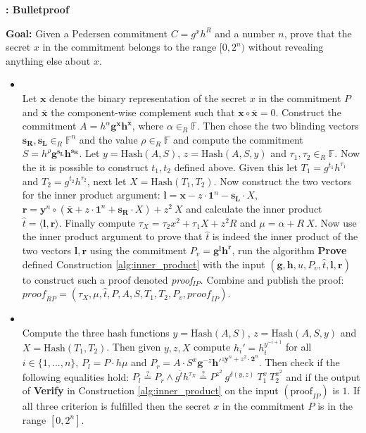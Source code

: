 \begin{algorithm}[]
\caption{\textbf{: Bulletproof}}
\textbf{Goal:}  Given a Pedersen commitment $C=g^x h^R$ and a number $n$, prove that the secret $x$ in the commitment belongs to the range  $[0,2^n)$ without revealing anything else about $x$.
\vspace{2pt}
\hline
\vspace{2pt}
\begin{itemize}
\item{}\\
Let $\bm{x}$ denote the binary representation of the secret $x$ in the commitment $P$ and $\bar{\bm{x}}$ the component-wise complement such  that $\bm{x}\circ \bar{\bm{x}} = 0$. Construct the commitment $A= h^\alpha \bm{g}^{\bm{x}} \bm{h}^\bar{\bm{x}}$, where $\alpha\in_R\mathds{F}$. Then chose the two blinding vectors $\bm{s_R},\bm{s_L}\in_R\mathds{F}^n$ and the value $\rho\in_R\mathds{F}$ and compute the commitment $S=h^\rho \bm{g}^{\bm{s_L}}\bm{h}^\bm{s_R}$. Let $y=\text{Hash}(A,S)$, $z=\text{Hash}(A,S,y)$ and $\tau_1,\tau_2\in_R\mathds{F}$. Now the it is possible to construct $t_1,t_2$ defined above. Given this let $T_1=g^{t_1}h^{\tau_1}$ and $T_2=g^{t_2}h^{\tau_2}$, next let $X=\text{Hash}(T_1,T_2)$. Now construct the two vectors for the inner product argument: $\bm{l} = \bm{x}-z\cdot \bm{1}^n-\bm{s_L}\cdot X$, $\bm{r}= \bm{y}^n\circ(\bar{\bm{x}}+ z\cdot \bm{1}^n+\bm{s_R}\cdot X ) + z^2\ X $ and calculate the inner product $\hat{t} = \langle \bm{l},\bm{r}\rangle$. Finally compute $\tau_X = \tau_2 x^2 + \tau_1 X + z^2 R$ and $\mu = \alpha+ R\:X$.  Now use the inner product argument to prove that $\hat{t}$ is indeed the inner product of the two vectors $\mathbf{l},\mathbf{r}$ using the commitment $P_v = \bm{g}^{\bm{l}}\bm{h}^\bm{r}$, run the algorithm  \textbf{Prove}  defined Construction \ref{alg:inner_product} with the input $(\bm{g},\bm{h},u,P_v,\hat{t},\bm{l},\bm{r})$ to construct such a proof denoted  \textit{proof$_{IP}$}. Combine and publish  the proof: $\textit{proof}_{RP} = (\tau_X, \mu , \hat{t}, P, A, S, T_1, T_2 , P_v ,\textit{proof}_{IP}) $.

\item{}\\
Compute the three hash functions $y= \text{Hash}(A,S)$, $z= \text{Hash}(A,S,y)$ and $X= \text{Hash}(T_1,T_2)$. Then given  $y,z,X$ compute $h_i' = h_i ^{y^{-i+1}}$ for all $i\in\{1,...,n\}$, $P_l = P\cdot h\mu$ and $P_r = A\cdot S ^x \bm{g}^ {-z}\bm{h'}^{z\bm{y}^n+z^2\cdot \bm{2}^n}$. Then check if the following equalities hold: $P_l\overset{?}{=} P_r \wedge g^{\hat{t}}h^{\tau_X} \overset{?}{=}  P ^{z^2}\:g^{\delta(y,z)}\:T_1^x\:T_2^{x^2}$ and if the output of \textbf{Verify} in Construction \ref{alg:inner_product} on the input $(\text{proof}_{IP})$ is $1$. If all three criterion is fulfilled then the secret  $x$ in the commitment $P$ is in the range $[0,2^n]$.
\end{itemize}
\label{alg:bullet}
\end{algorithm}

